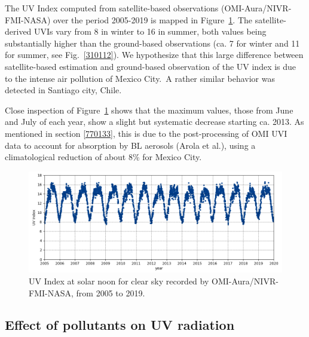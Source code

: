 \documentclass[10pt]{article}
\begin{document}
The UV Index computed from satellite-based observations
(OMI-Aura/NIVR-FMI-NASA) over the period 2005-2019 is mapped in
Figure~{\ref{485116}}. The satellite-derived UVIs vary
from 8 in winter to 16 in summer, both values being substantially higher
than the ground-based observations (ca. 7 for winter and 11 for summer,
see Fig.~{\ref{310112}}). We hypothesize that this
large difference between satellite-based estimation and ground-based
observation of the UV index is due to the intense air pollution of
Mexico City.~A rather similar behavior was detected in Santiago city,
Chile.\cite{Cabrera_2012}

Close inspection of Figure~{\ref{485116}} shows that
the maximum values, those from June and July of each year, show a slight
but systematic decrease starting ca. 2013. As mentioned in section
 {\ref{770133}}, this is due to the post-processing of
OMI UVI data to account for absorption by BL aerosols (Arola et
al.)\cite{Arola_2009}, using a climatological reduction of about 8\%
for Mexico City. ~
\begin{figure}[H]
  \begin{center}
    \includegraphics[width=0.70\columnwidth]{figures/CSUVindex}
    \caption{{UV Index at solar noon for clear sky recorded by OMI-Aura/NIVR-FMI-NASA,
          from 2005 to 2019.
            {\label{485116}}%
        }}
  \end{center}
\end{figure}

\subsection*{Effect of pollutants on UV
  radiation}

{\label{884442}}
\end{document}
